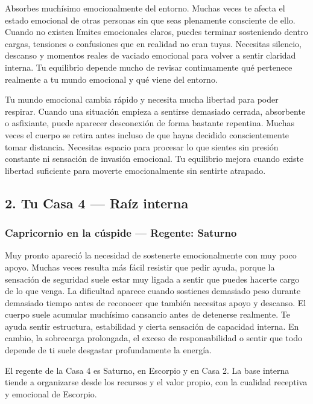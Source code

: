 \documentclass[11pt,a4paper]{article}
\begin{document}
Absorbes muchísimo emocionalmente del entorno. Muchas veces te afecta el estado emocional de otras personas sin que seas plenamente consciente de ello. Cuando no existen límites emocionales claros, puedes terminar sosteniendo dentro cargas, tensiones o confusiones que en realidad no eran tuyas. Necesitas silencio, descanso y momentos reales de vaciado emocional para volver a sentir claridad interna. Tu equilibrio depende mucho de revisar continuamente qué pertenece realmente a tu mundo emocional y qué viene del entorno.

Tu mundo emocional cambia rápido y necesita mucha libertad para poder respirar. Cuando una situación empieza a sentirse demasiado cerrada, absorbente o asfixiante, puede aparecer desconexión de forma bastante repentina. Muchas veces el cuerpo se retira antes incluso de que hayas decidido conscientemente tomar distancia. Necesitas espacio para procesar lo que sientes sin presión constante ni sensación de invasión emocional. Tu equilibrio mejora cuando existe libertad suficiente para moverte emocionalmente sin sentirte atrapado.

\vspace{0.8cm}

\subsection{2. Tu Casa 4 — Raíz interna}

\subsubsection*{Capricornio en la cúspide — Regente: Saturno}

Muy pronto apareció la necesidad de sostenerte emocionalmente con muy poco apoyo. Muchas veces resulta más fácil resistir que pedir ayuda, porque la sensación de seguridad suele estar muy ligada a sentir que puedes hacerte cargo de lo que venga. La dificultad aparece cuando sostienes demasiado peso durante demasiado tiempo antes de reconocer que también necesitas apoyo y descanso. El cuerpo suele acumular muchísimo cansancio antes de detenerse realmente. Te ayuda sentir estructura, estabilidad y cierta sensación de capacidad interna. En cambio, la sobrecarga prolongada, el exceso de responsabilidad o sentir que todo depende de ti suele desgastar profundamente la energía.

El regente de la Casa 4 es Saturno, en Escorpio y en Casa 2. La base interna tiende a organizarse desde los recursos y el valor propio, con la cualidad receptiva y emocional de Escorpio.
\end{document}
